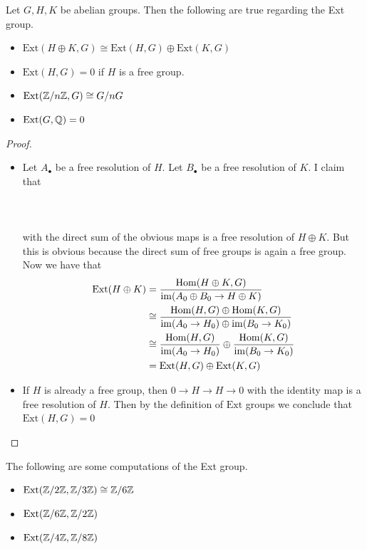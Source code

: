 \documentclass[a4paper]{article}
\begin{document}
\begin{prp}{}{} Let $G,H,K$ be abelian groups. Then the following are true regarding the Ext group. 
\begin{itemize}
\item $\text{Ext}(H\oplus K,G)\cong\text{Ext}(H,G)\oplus\text{Ext}(K,G)$
\item $\text{Ext}(H,G)=0$ if $H$ is a free group. 
\item $\text{Ext}(\mathbb{Z}/n\mathbb{Z},G)\cong G/nG$
\item $\text{Ext}(G,\mathbb{Q})=0$
\end{itemize} \tcbline
\begin{proof}~\\
\begin{itemize}
\item Let $A_\bullet$ be a free resolution of $H$. Let $B_\bullet$ be a free resolution of $K$. I claim that \\~\\
\\~\\
with the direct sum of the obvious maps is a free resolution of $H\oplus K$. But this is obvious because the direct sum of free groups is again a free group. Now we have that 
\begin{align*}
\text{Ext}(H\oplus K)&=\frac{\operatorname{Hom}(H\oplus K,G)}{\operatorname{im}(A_0\oplus B_0\to H\oplus K)}\\
&\cong\frac{\operatorname{Hom}(H,G)\oplus\operatorname{Hom}(K,G)}{\operatorname{im}(A_0\to H_0)\oplus\operatorname{im}(B_0\to K_0)}\\
&\cong\frac{\operatorname{Hom}(H,G)}{\operatorname{im}(A_0\to H_0)}\oplus\frac{\operatorname{Hom}(K,G)}{\operatorname{im}(B_0\to K_0)}\\
&=\text{Ext}(H,G)\oplus\text{Ext}(K,G)
\end{align*}
\item If $H$ is already a free group, then $0\to H\to H\to 0$ with the identity map is a free resolution of $H$. Then by the definition of $\text{Ext}$ groups we conclude that $\text{Ext}(H,G)=0$
\end{itemize}
\end{proof}
\end{prp}

\begin{eg}{}{} The following are some computations of the Ext group. 
\begin{itemize}
\item $\text{Ext}(\mathbb{Z}/2\mathbb{Z},\mathbb{Z}/3\mathbb{Z})\cong\mathbb{Z}/6\mathbb{Z}$
\item $\text{Ext}(\mathbb{Z}/6\mathbb{Z},\mathbb{Z}/2\mathbb{Z})$
\item $\text{Ext}(\mathbb{Z}/4\mathbb{Z},\mathbb{Z}/8\mathbb{Z})$
\end{itemize}
\end{eg}
\end{document}

